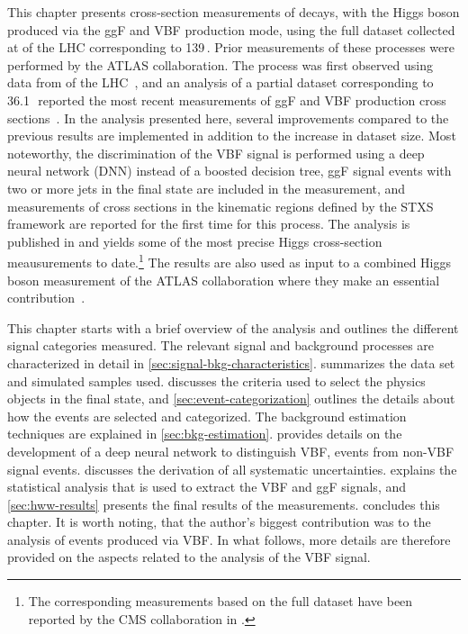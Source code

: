 This chapter presents cross-section measurements of \HWWdet decays, with the Higgs boson produced via the ggF and VBF production mode, using the full dataset collected at \RunTwo of the LHC corresponding to 139\,\ifb. 
Prior measurements of these processes were performed by the ATLAS collaboration. 
The \HWW process was first observed using data from \RunOne of the LHC~\cite{HIGG-2013-13}, and an analysis of a partial \RunTwo dataset corresponding to 36.1\,\ifb\ reported the most recent measurements of ggF and VBF production cross sections~\cite{HIGG-2013-13}.
In the analysis presented here, several improvements compared to the previous \RunTwo results are implemented in addition to the increase in dataset size. Most noteworthy, the discrimination of the VBF signal is performed using a deep neural network (DNN) instead of a boosted decision tree, ggF signal events with two or more jets in the final state are included in the measurement, and measurements of cross sections in the kinematic regions defined by the STXS framework are reported for the first time for this process.
The analysis is published in  and yields some of the most precise Higgs cross-section meausurements to date.\footnote{The corresponding measurements based on the full \RunTwo dataset have been reported by the CMS collaboration in .}
The results are also used as input to a combined Higgs boson measurement of the ATLAS collaboration where they make an essential contribution~\cite{NaturePaper}.

This chapter starts with a brief overview of the analysis and outlines the different signal categories measured. 
The relevant signal and background processes are characterized in detail in \cref{sec:signal-bkg-characteristics}. 
 summarizes the data set and simulated samples used.
 discusses the criteria used to select the physics objects in the final state, and \cref{sec:event-categorization} outlines the details about how the events are selected and categorized. 
The background estimation techniques are explained in \cref{sec:bkg-estimation}. 
 provides details on the development of a deep neural network to distinguish VBF, \HWW events from non-VBF signal events. 
 discusses the derivation of all systematic uncertainties. 
 explains the statistical analysis that is used to extract the VBF and ggF signals, and \cref{sec:hww-results} presents the final results of the measurements.
 concludes this chapter.
It is worth noting, that the author's biggest contribution was to the analysis of \HWW events produced via VBF. In what follows, more details are therefore provided on the aspects related to the analysis of the VBF signal.

